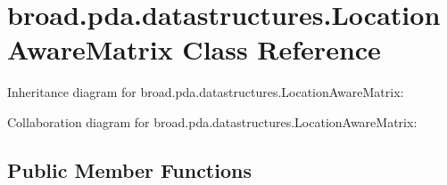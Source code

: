 \hypertarget{classbroad_1_1pda_1_1datastructures_1_1_location_aware_matrix}{\section{broad.\+pda.\+datastructures.\+Location\+Aware\+Matrix Class Reference}
\label{classbroad_1_1pda_1_1datastructures_1_1_location_aware_matrix}
}


Inheritance diagram for broad.\+pda.\+datastructures.\+Location\+Aware\+Matrix\+:


Collaboration diagram for broad.\+pda.\+datastructures.\+Location\+Aware\+Matrix\+:
\subsection*{Public Member Functions}
